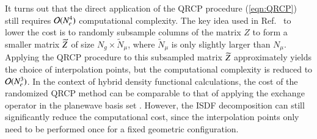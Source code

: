 It turns out that the direct application of the QRCP procedure (\cref{eqn:QRCP})
still requires $\mathcal{O}(N_{e}^{4})$ computational complexity. The key idea used in
Ref.~\cite{JCP_302_329_2015_ISDF} to lower the cost is to randomly subsample
columns of the matrix $Z$ to form a smaller matrix $\widetilde{Z}$ of size $N_
{g}\times \widetilde{N}_\mu$, where $\widetilde{N}_\mu$ is only slightly larger
than $N_{\mu}$.  Applying the QRCP procedure to this subsampled matrix $\widetilde{Z}$
approximately yields the choice of interpolation points, but the computational
complexity is reduced to $\mathcal{O}(N_{e}^3)$. In the context of hybrid density
functional calculations, the cost of the randomized QRCP method can be
comparable to that of applying the exchange operator in the planewave basis set 
\cite{JCTC_2017_ISDF}. However, the ISDF decomposition can still significantly
reduce the computational cost, since the interpolation points only need to be
performed once for a fixed geometric configuration.